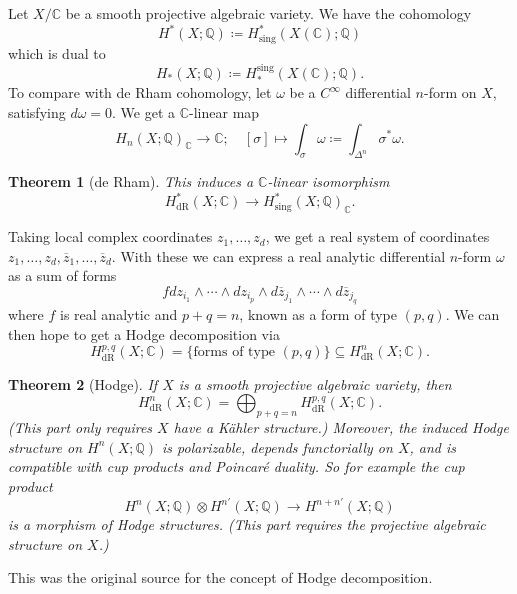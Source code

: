 \documentclass{article}
\newtheorem*{theorem}{Theorem}
\theoremstyle{definition}
\newcommand{\conj}[1]{\overline{#1}}
\newcommand{\sing}{\mathrm{sing}}
\newcommand{\dR}{\mathrm{dR}}
\newcommand{\Q}{\mathbb{Q}}
\newcommand{\C}{\mathbb{C}}
\begin{document}
Let $X/\C$ be a smooth projective algebraic variety. We have the cohomology
\begin{equation*}
    H^*(X;\Q) \coloneq H^*_\sing(X(\C);\Q)
\end{equation*}
which is dual to
\begin{equation*}
    H_*(X;\Q) \coloneq H_*^\sing(X(\C);\Q).
\end{equation*}
To compare with de Rham cohomology, let $\omega$ be a $C^\infty$ differential
$n$-form on $X$, satisfying $d\omega=0$. We get a $\C$-linear map
\begin{equation*}
    H_n(X;\Q)_\C \to \C;\quad
    [\sigma] \mapsto \int_\sigma\omega \coloneq \int_{\Delta^n}\sigma^*\omega.
\end{equation*}
\begin{theorem}[de Rham]
    This induces a $\C$-linear isomorphism
    \begin{equation*}
        H_\dR^*(X;\C) \to H^*_\sing(X;\Q)_\C.
    \end{equation*}
\end{theorem}
Taking local complex coordinates $z_1,\ldots,z_d$, we get a real system of
coordinates $z_1,\ldots,z_d,\conj z_1,\ldots,\conj z_d$. With these we
can express a real analytic differential $n$-form $\omega$ as a sum of forms
\begin{equation*}
    fdz_{i_1}\wedge\cdots\wedge dz_{i_p}
        \wedge d\conj z_{j_1}\wedge\cdots\wedge d\conj z_{j_q}
\end{equation*}
where $f$ is real analytic and $p+q=n$, known as a form of type $(p,q)$. We can
then hope to get a Hodge decomposition via
\begin{equation*}
    H^{p,q}_\dR(X;\C)
        = \{\text{forms of type $(p,q)$}\}
        \subseteq H^n_\dR(X;\C).
\end{equation*}
\begin{theorem}[Hodge]
    If $X$ is a smooth projective algebraic variety, then
    \begin{equation*}
        H_\dR^n(X;\C) = \bigoplus_{p+q=n}H^{p,q}_\dR(X;\C).
    \end{equation*}
    (This part only requires $X$ have a K\"ahler structure.) Moreover, the
    induced Hodge structure on $H^n(X;\Q)$ is polarizable, depends functorially
    on $X$, and is compatible with cup products and Poincar\'e duality. So for
    example the cup product
    \begin{equation*}
        H^n(X;\Q)\otimes H^{n'}(X;\Q) \to H^{n+n'}(X;\Q)
    \end{equation*}
    is a morphism of Hodge structures. (This part requires the projective
    algebraic structure on $X$.)
\end{theorem}
This was the original source for the concept of Hodge decomposition.
\end{document}
